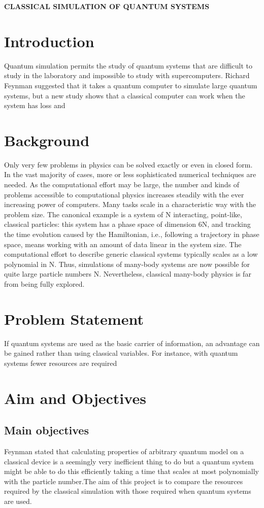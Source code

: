 \documentclass[options]{article}
\begin{document}
\textbf{CLASSICAL SIMULATION OF QUANTUM SYSTEMS}

\section{\textbf{ Introduction}}
Quantum simulation permits the study of quantum systems that are difficult to study in the laboratory and impossible to study with supercomputers.
Richard Feynman suggested that it takes a quantum computer to simulate large quantum systems, but a new study shows that a classical computer can work when the system has loss and 


\section{\textbf{ Background }}
Only very few problems in physics can be solved exactly or even in closed form. In the vast majority of cases, more or less sophisticated numerical techniques are needed. As the computational effort may be large, the number and kinds of problems accessible to computational physics increases steadily with the ever increasing power of computers. Many tasks scale in a characteristic way with the problem size. The canonical example is a system of N interacting, point-like, classical particles: this system has a phase space of dimension 6N, and tracking the time evolution caused by the Hamiltonian, i.e., following a trajectory in phase space, means working with an amount of data linear in the system size. The computational effort to describe generic classical systems typically scales as a low polynomial in N. Thus, simulations of many-body systems are now possible for quite large particle numbers N. Nevertheless, classical many-body physics is far from being fully explored.

\section{\textbf{ Problem Statement}}
If quantum systems are used as the basic carrier of information, an advantage can be gained rather than using classical variables. For instance, with quantum systems fewer resources are required

\section{\textbf{ Aim and Objectives}}

\subsection{Main objectives}
Feynman stated that calculating properties of arbitrary quantum model on a classical device is a seemingly very inefficient thing to do but a quantum system might be able to do this efficiently taking a time that scales at most polynomially with the particle number.The aim of this project is to compare the resources required by the classical simulation with those required when quantum systems are used.
\end{document}
